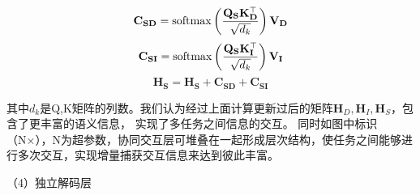 \begin{equation}
  \mathbf{C}_{\mathbf{SD}}=\operatorname{softmax}\left(\frac{\mathbf{Q}_{\mathbf{S}} \mathbf{K}_{\mathbf{D}}^{\top}}{\sqrt{d_{k}}}\right) \mathbf{V}_{\mathbf{D}}\\
\end{equation}
\begin{equation}
  \mathbf{C}_{\mathbf{SI}}=\operatorname{softmax}\left(\frac{\mathbf{Q}_{\mathbf{S}} \mathbf{K}_{\mathbf{I}}^{\top}}{\sqrt{d_{k}}}\right) \mathbf{V}_{\mathbf{I}}\\
\end{equation}
\begin{equation}
  \mathbf{H}_\mathbf{S}=\mathbf{H}_\mathbf{S}+\mathbf{C}_{\mathbf{SD}}+\mathbf{C}_{\mathbf{SI}}
\end{equation}

其中$d_k$是Q,K矩阵的列数。我们认为经过上面计算更新过后的矩阵$\mathbf{H}_{D},\mathbf{H}_{I},\mathbf{H}_{S}$，包含了更丰富的语义信息，
实现了多任务之间信息的交互。
同时如图中标识（N×），N为超参数，协同交互层可堆叠在一起形成层次结构，使任务之间能够进行多次交互，实现增量捕获交互信息来达到彼此丰富。

（4）独立解码层

